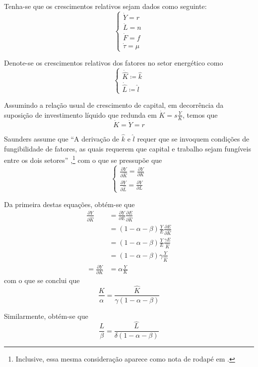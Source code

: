 Tenha-se que os crescimentos relativos sejam dados como seguinte:
$$
\begin{cases}
\dot{Y}=r \\
\dot{L}=n \\
\dot{F} = f  \\
\dot{\tau} = \mu
\end{cases}
$$

Denote-se os crescimentos relativos dos fatores no setor energético como
$$
\begin{cases}
\dot{\hat{K}} \coloneqq \hat{k} \\
\dot{\hat{L}} \coloneqq \hat{l}
\end{cases}
$$

Assumindo a relação usual de crescimento de capital, em decorrência da suposição de investimento líquido que redunda em $\dot{K} = s \frac{Y}{K}$, temos que 
$$
\dot{K}=\dot{Y}=r
$$

Saunders assume que ``A derivação de $\hat{k}$ e $\hat{l}$ requer que se invoquem condições de fungibilidade de fatores, as quais requerem que capital e trabalho sejam fungíveis entre os dois setores'' \parencite[p. 499]{Saunders2000},\footnote{Inclusive, essa mesma consideração aparece como nota de rodapé em \textcite[p. 144, n. 1]{Saunders1992}.} com o que se pressupõe que
$$
\begin{cases}
\frac{ \partial Y }{ \partial \hat{K} }  = \frac{ \partial Y }{ \partial K } \\
\frac{ \partial Y }{ \partial \hat{L} } = \frac{ \partial Y }{ \partial L }  
\end{cases}
$$

Da primeira destas equações, obtém-se que
\begin{align*}
\frac{ \partial Y }{ \partial \hat{K} } &= \frac{ \partial Y }{ \partial E } \frac{ \partial E }{ \partial \hat{K} }  \\
&= (1-\alpha-\beta) \frac{Y}{E} \frac{ \partial E }{ \partial \hat{K} } \\
&= (1-\alpha-\beta) \frac{Y}{E} \frac{\gamma E}{\hat{K}} \\
&= (1-\alpha-\beta) \gamma \frac{Y}{\hat{K}} \\
= \frac{ \partial Y }{ \partial K } &= \alpha \frac{Y}{K}
\end{align*}
com o que se conclui que
$$
\frac{K}{\alpha} = \frac{\hat{K}}{\gamma (1-\alpha-\beta)}
$$

Similarmente, obtém-se que
$$
\frac{L}{\beta} = \frac{\hat{L}}{\delta(1-\alpha-\beta)}
$$

